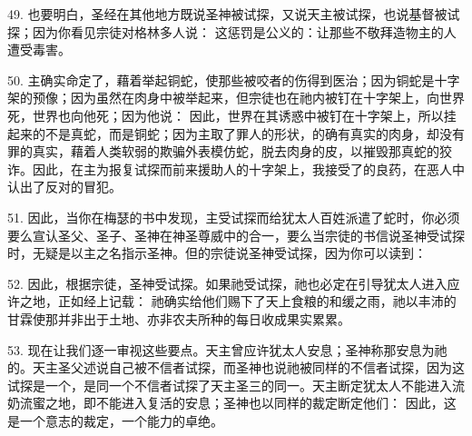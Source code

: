 49. 也要明白，圣经在其他地方既说圣神被试探，又说天主被试探，也说基督被试探；因为你看见宗徒对格林多人说： 这惩罚是公义的：让那些不敬拜造物主的人遭受毒害。\par

50. 主确实命定了，藉着举起铜蛇，使那些被咬者的伤得到医治；因为铜蛇是十字架的预像；因为虽然在肉身中被举起来，但宗徒也在祂内被钉在十字架上，向世界死，世界也向他死；因为他说： 因此，世界在其诱惑中被钉在十字架上，所以挂起来的不是真蛇，而是铜蛇；因为主取了罪人的形状，的确有真实的肉身，却没有罪的真实，藉着人类软弱的欺骗外表模仿蛇，脱去肉身的皮，以摧毁那真蛇的狡诈。因此，在主为报复试探而前来援助人的十字架上，我接受了的良药，在恶人中认出了反对的冒犯。\par

51. 因此，当你在梅瑟的书中发现，主受试探而给犹太人百姓派遣了蛇时，你必须要么宣认圣父、圣子、圣神在神圣尊威中的合一，要么当宗徒的书信说圣神受试探时，无疑是以主之名指示圣神。但的宗徒说圣神受试探，因为你可以读到：\par

52. 因此，根据宗徒，圣神受试探。如果祂受试探，祂也必定在引导犹太人进入应许之地，正如经上记载： 祂确实给他们赐下了天上食粮的和缓之雨，祂以丰沛的甘霖使那并非出于土地、亦非农夫所种的每日收成果实累累。\par

53. 现在让我们逐一审视这些要点。天主曾应许犹太人安息；圣神称那安息为祂的。天主圣父述说自己被不信者试探，而圣神也说祂被同样的不信者试探，因为这试探是一个，是同一个不信者试探了天主圣三的同一。天主断定犹太人不能进入流奶流蜜之地，即不能进入复活的安息；圣神也以同样的裁定断定他们： 因此，这是一个意志的裁定，一个能力的卓绝。\par


